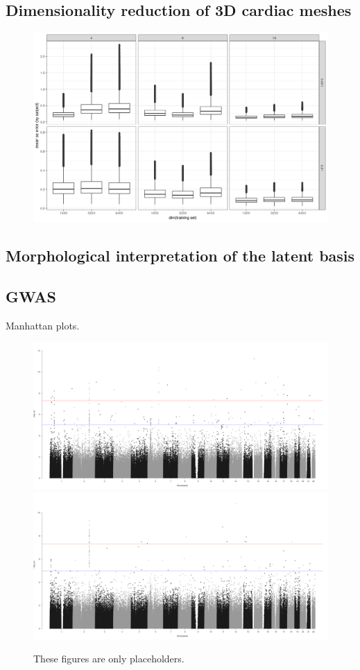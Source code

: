 \documentclass[twocolumn]{llncs}
\begin{document}
\subsection{Dimensionality reduction of 3D cardiac meshes}

\begin{figure}
\includegraphics[width=\linewidth]{figs/mean_sq_error.png}
\caption{}
\end{figure}



\subsection{Morphological interpretation of the latent basis}


\subsection{GWAS}
Manhattan plots.

\begin{figure}
\includegraphics[width=0.8\linewidth]{figs/manhattan_LVEDV_automatic_adj.png}
\includegraphics[width=0.8\linewidth]{figs/manhattan_LVM_automatic_adj.png}
\caption{These figures are only placeholders.}
\end{figure}
\end{document}
